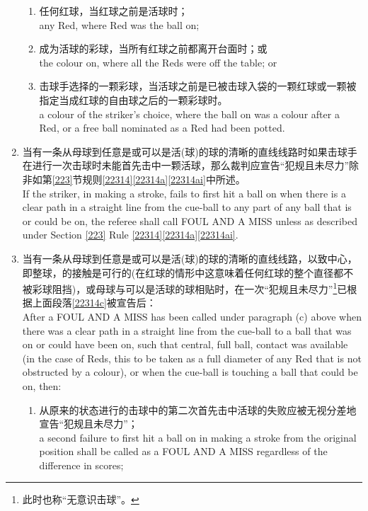 \begin{enumerate}[label=(\alph*)]
    \begin{enumerate}[label=(\roman*)]
        \item 任何红球，当红球之前是活球时；\\
        any Red, where Red was the ball on;
        \item 成为活球的彩球，当所有红球之前都离开台面时；或\\
        the colour on, where all the Reds were off the table; or
        \item 击球手选择的一颗彩球，当活球之前是已被击球入袋的一颗红球或一颗被指定当成红球的自由球之后的一颗彩球时。\\
        a colour of the striker's choice, where the ball on was a colour after a Red, or a free ball nominated as a Red had been potted.
    \end{enumerate}
    \item \label{22314c}当有一条从母球到任意是或可以是活(球)的球的清晰的直线线路时如果击球手在进行一次击球时未能首先击中一颗活球，那么裁判应宣告``犯规且未尽力''除非如第\ref{223}节规则\ref{22314}\ref{22314a}\ref{22314ai}中所述。\\
    If the striker, in making a stroke, fails to first hit a ball on when there is a clear path in a straight line from the cue-ball to any part of any ball that is or could be on, the referee shall call FOUL AND A MISS unless as described under Section \ref{223} Rule \ref{22314}\ref{22314a}\ref{22314ai}.
    \item \label{22314d}当有一条从母球到任意是或可以是活(球)的球的清晰的直线线路，以致中心，即整球，的接触是可行的(在红球的情形中这意味着任何红球的整个直径都不被彩球阻挡)，或母球与可以是活球的球相贴时，在一次``犯规且未尽力''\footnote{此时也称``无意识击球''。}已根据上面段落\ref{22314c}被宣告后：\\
    After a FOUL AND A MISS has been called under paragraph (c) above when there was a clear path in a straight line from the cue-ball to a ball that was on or could have been on, such that central, full ball, contact was available (in the case of Reds, this to be taken as a full diameter of any Red that is not obstructed by a colour), or when the cue-ball is touching a ball that could be on, then:
    \begin{enumerate}[label=(\roman*)]
        \item \label{22314di}从原来的状态进行的击球中的第二次首先击中活球的失败应被无视分差地宣告``犯规且未尽力''；\\
        a second failure to first hit a ball on in making a stroke from the original position shall be called as a FOUL AND A MISS regardless of the difference in scores;

\end{enumerate}
\end{enumerate}
